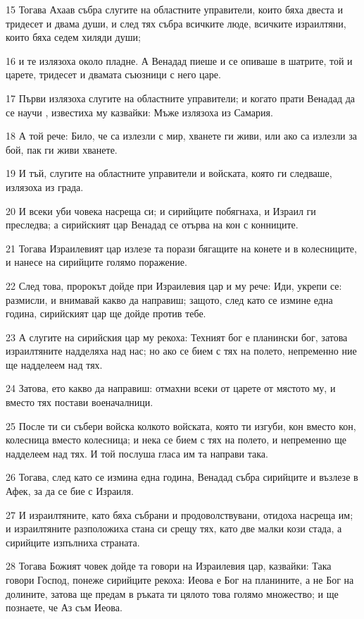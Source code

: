 \par 15 Тогава Ахаав събра слугите на областните управители, които бяха двеста и тридесет и двама души, и след тях събра всичките люде, всичките израилтяни, които бяха седем хиляди души;
\par 16 и те излязоха около пладне. А Венадад пиеше и се опиваше в шатрите, той и царете, тридесет и двамата съюзници с него царе.
\par 17 Първи излязоха слугите на областните управители; и когато прати Венадад да се научи , известиха му казвайки: Мъже излязоха из Самария.
\par 18 А той рече: Било, че са излезли с мир, хванете ги живи, или ако са излезли за бой, пак ги живи хванете.
\par 19 И тъй, слугите на областните управители и войската, която ги следваше, излязоха из града.
\par 20 И всеки уби човека насреща си; и сирийците побягнаха, и Израил ги преследва; а сирийският цар Венадад се отърва на кон с конниците.
\par 21 Тогава Израилевият цар излезе та порази бягащите на конете и в колесниците, и нанесе на сирийците голямо поражение.
\par 22 След това, пророкът дойде при Израилевия цар и му рече: Иди, укрепи се: размисли, и внимавай какво да направиш; защото, след като се измине една година, сирийският цар ще дойде против тебе.
\par 23 А слугите на сирийския цар му рекоха: Техният бог е планински бог, затова израилтяните надделяха над нас; но ако се бием с тях на полето, непременно ние ще надделеем над тях.
\par 24 Затова, ето какво да направиш: отмахни всеки от царете от мястото му, и вместо тях постави военачалници.
\par 25 После ти си събери войска колкото войската, която ти изгуби, кон вместо кон, колесница вместо колесница; и нека се бием с тях на полето, и непременно ще надделеем над тях. И той послуша гласа им та направи така.
\par 26 Тогава, след като се измина една година, Венадад събра сирийците и възлезе в Афек, за да се бие с Израиля.
\par 27 И израилтяните, като бяха събрани и продоволствувани, отидоха насреща им; и израилтяните разположиха стана си срещу тях, като две малки кози стада, а сирийците изпълниха страната.
\par 28 Тогава Божият човек дойде та говори на Израилевия цар, казвайки: Така говори Господ, понеже сирийците рекоха: Иеова е Бог на планините, а не Бог на долините, затова ще предам в ръката ти цялото това голямо множество; и ще познаете, че Аз съм Иеова.

